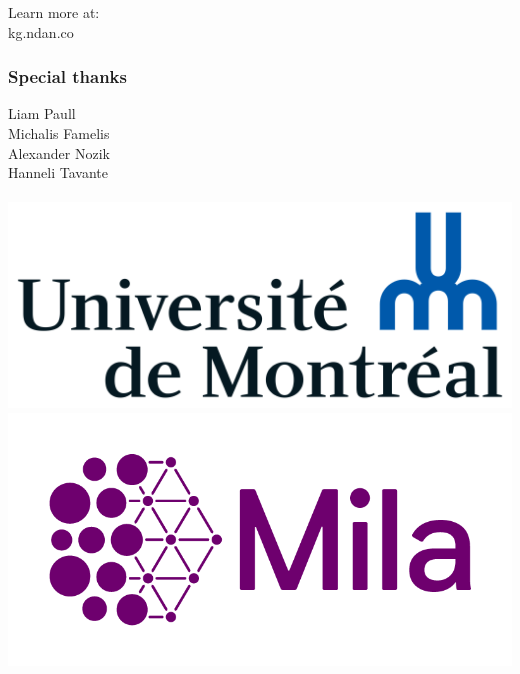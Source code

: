 \documentclass{beamer}
\begin{document}
    \begin{frame}
        \begin{center}
            \Huge{Learn more at: \\
            kg.ndan.co}
        \end{center}
    \end{frame}

    \begin{frame}
        \frametitle{Special thanks}
        \begin{itemize}
            \begin{center}
                \huge{
                Liam Paull \\
                Michalis Famelis \\
                Alexander Nozik \\
                Hanneli Tavante \\~\\
                }
                \includegraphics[scale=0.1]{udem.png}
                \includegraphics[scale=0.4]{mila.png}
            \end{center}
        \end{itemize}
    \end{frame}
\end{document}
